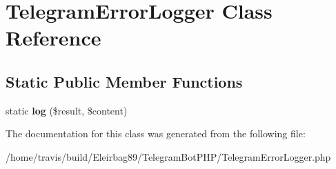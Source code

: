 \hypertarget{class_telegram_error_logger}{\section{Telegram\-Error\-Logger Class Reference}
\label{class_telegram_error_logger}
}
\subsection*{Static Public Member Functions}
\begin{DoxyCompactItemize}
\item 
\hypertarget{class_telegram_error_logger_aeca7b590a3b91784d338f961098c8e85}{static {\bfseries log} (\$result, \$content)}\label{class_telegram_error_logger_aeca7b590a3b91784d338f961098c8e85}

\end{DoxyCompactItemize}


The documentation for this class was generated from the following file\-:\begin{DoxyCompactItemize}
\item 
/home/travis/build/\-Eleirbag89/\-Telegram\-Bot\-P\-H\-P/Telegram\-Error\-Logger.\-php\end{DoxyCompactItemize}
